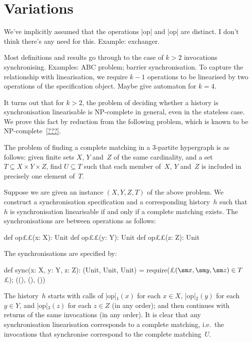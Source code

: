 \section{Variations}
\label{sec:variations}

We've implicitly assumed that the operations |op| and |op| are
distinct.  I don't think there's any need for this.  Example: exchanger.  

Most definitions and results go through to the case of $k > 2$ invocations
synchronising.  Examples: ABC problem; barrier synchronisation.  To capture
the relationship with linearisation, we require $k-1$ operations to be
linearised by two operations of the specification object.  Maybe give
automaton for $k = 4$.  

It turns out that for $k > 2$, the problem of deciding whether a history is
synchronisation linearisable is NP-complete in general, even in the stateless
case.  We prove this fact by reduction from the following problem, which is
known to be NP-complete~\ref{???}.
%
\begin{definition}
The problem of finding a complete matching in a 3-partite hypergraph is as
follows: given finite sets $X$, $Y$ and~$Z$ of the same cardinality, and a set
$T \subseteq X \times Y \times Z$, find $U \subseteq T$ such that each member
of~$X$, $Y$ and~$Z$ is included in precisely one element of~$T$.
\end{definition}

Suppose we are given an instance $(X, Y, Z, T)$ of the above problem.  We
construct a synchronisation specification and a corresponding history~$h$ such
that $h$ is synchronisation linearisable if and only if a complete matching
exists.  The synchronisations are between operations as follows:
\begin{scala}
  def op££(x: X): Unit
  def op££(y: Y): Unit
  def op££(z: Z): Unit
\end{scala}
%
The synchronisations are specified by:
%
\begin{scala}
  def sync(x: X, y: Y, z: Z): (Unit, Unit, Unit) = {
    require(£$(\sm x, \sm y, \sm z) \in T$£); ((), (), ())
  }
\end{scala}
%
The history~$h$ starts with calls of |op|$_1(x)$ for each $x \in X$,
|op|$_2(y)$ for each $y \in Y$, and |op|$_3(z)$ for each $z \in Z$ (in any
order); and then continues with returns of the same invocations (in any
order).  It is clear that any synchronisation linearisation corresponds to a
complete matching, i.e.~the invocations that synchronise correspond to the
complete matching~$U$.

